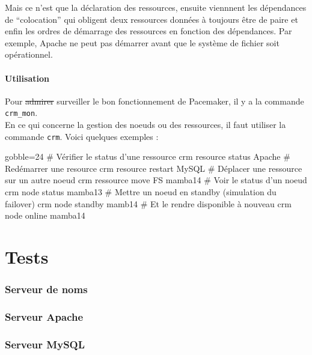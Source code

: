 \documentclass[11pt,a4paper]{report}
\begin{document}
                    Mais ce n'est que la déclaration des ressources, ensuite viennnent les dépendances de ``colocation'' qui obligent deux ressources données à toujours être de paire et enfin les ordres de démarrage des ressources en fonction des dépendances.
                    Par exemple, Apache ne peut pas démarrer avant que le système de fichier soit opérationnel.
            
                \subsection{Utilisation}
                
                    Pour \st{admirer} surveiller le bon fonctionnement de Pacemaker, il y a la commande \verb+crm_mon+.\\
                
                    En ce qui concerne la gestion des noeuds ou des ressources, il faut utiliser la commande \verb+crm+. Voici quelques exemples :\\
                
                    \begin{bashcode*}{gobble=24}
                        # Vérifier le status d'une ressource
                        crm resource status Apache
                        # Redémarrer une resource
                        crm resource restart MySQL
                        # Déplacer une ressource sur un autre noeud
                        crm ressource move FS mamba14
                        # Voir le status d'un noeud
                        crm node status mamba13
                        # Mettre un noeud en standby (simulation du failover)
                        crm node standby mamb14
                        # Et le rendre disponible à nouveau
                        crm node online mamba14
                    \end{bashcode*}

    \part{Tests}
        \section{Serveur de noms}
        \section{Serveur Apache}
        \section{Serveur MySQL}
\end{document}
